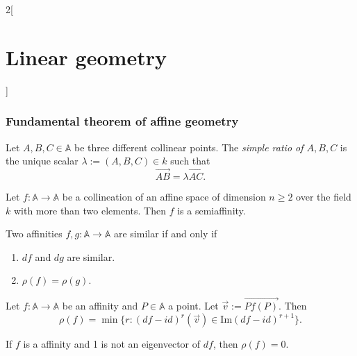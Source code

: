 \documentclass[class=article,10pt,crop=false]{standalone}
\begin{document}
\begin{multicols}{2}[\section{Linear geometry}]
\subsubsection{Fundamental theorem of affine geometry}
\begin{definition}
Let $A,B,C\in\mathbb{A}$ be three different collinear points. The \textit{simple ratio of $A,B,C$} is the unique scalar $\lambda:=(A,B,C)\in k$ such that $$\overrightarrow{AB}=\lambda\overrightarrow{AC}.$$
\begin{theorem}
Let $f:\mathbb{A}\rightarrow\mathbb{A}$ be a collineation of an affine space of dimension $n\geq 2$ over the field $k$ with more than two elements. Then $f$ is a semiaffinity.
\end{theorem}
\begin{prop}
Two affinities $f,g:\mathbb{A}\rightarrow\mathbb{A}$ are similar if and only if
\begin{enumerate}
    \item $df$ and $dg$ are similar.
    \item $\rho(f)=\rho(g)$.
\end{enumerate}
\end{prop}
\begin{theorem}
Let $f:\mathbb{A}\rightarrow\mathbb{A}$ be an affinity and $P\in\mathbb{A}$ a point. Let $\overrightarrow{v}:=\overrightarrow{Pf(P)}$. Then $$\rho(f)=\min\{r:(df-id)^r(\overrightarrow{v})\in\text{Im}(df-id)^{r+1}\}.$$
\end{theorem}
\begin{corollary}
If $f$ is a affinity and 1 is not an eigenvector of $df$, then $\rho(f)=0$.
\end{corollary}
\end{definition}

\end{multicols}
\end{document}
